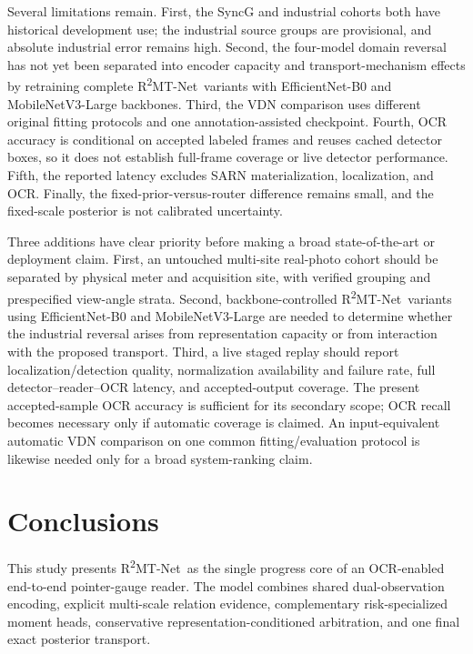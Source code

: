 \documentclass[electronics,article,submit,oneauthor]{Definitions/mdpi}
\newcommand{\modelname}{R\textsuperscript{2}MT-Net}
\begin{document}
Several limitations remain. First, the SyncG and industrial cohorts both have historical development use; the industrial source groups are provisional, and absolute industrial error remains high. Second, the four-model domain reversal has not yet been separated into encoder capacity and transport-mechanism effects by retraining complete \modelname\ variants with EfficientNet-B0 and MobileNetV3-Large backbones. Third, the VDN comparison uses different original fitting protocols and one annotation-assisted checkpoint. Fourth, OCR accuracy is conditional on accepted labeled frames and reuses cached detector boxes, so it does not establish full-frame coverage or live detector performance. Fifth, the reported latency excludes SARN materialization, localization, and OCR. Finally, the fixed-prior-versus-router difference remains small, and the fixed-scale posterior is not calibrated uncertainty.

Three additions have clear priority before making a broad state-of-the-art or deployment claim. First, an untouched multi-site real-photo cohort should be separated by physical meter and acquisition site, with verified grouping and prespecified view-angle strata. Second, backbone-controlled \modelname\ variants using EfficientNet-B0 and MobileNetV3-Large are needed to determine whether the industrial reversal arises from representation capacity or from interaction with the proposed transport. Third, a live staged replay should report localization/detection quality, normalization availability and failure rate, full detector--reader--OCR latency, and accepted-output coverage. The present accepted-sample OCR accuracy is sufficient for its secondary scope; OCR recall becomes necessary only if automatic coverage is claimed. An input-equivalent automatic VDN comparison on one common fitting/evaluation protocol is likewise needed only for a broad system-ranking claim.

\section{Conclusions}
\label{sec:conclusions}

This study presents \modelname\ as the single progress core of an OCR-enabled end-to-end pointer-gauge reader. The model combines shared dual-observation encoding, explicit multi-scale relation evidence, complementary risk-specialized moment heads, conservative representation-conditioned arbitration, and one final exact posterior transport.
\end{document}
